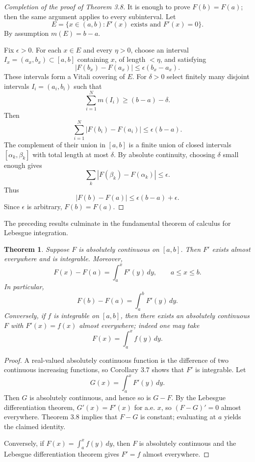 \documentclass[11pt,openany]{book}
\newtheorem{theorem}{Theorem}[section]
\begin{document}
\begin{proof}[Completion of the proof of Theorem 3.8]
It is enough to prove $F(b)=F(a)$; then the same argument applies to every subinterval. Let
\[
E=\{x\in(a,b):F'(x)\text{ exists and }F'(x)=0\}.
\]
By assumption $m(E)=b-a$.

Fix $\epsilon>0$. For each $x\in E$ and every $\eta>0$, choose an interval $I_x=(a_x,b_x)\subset[a,b]$ containing $x$, of length $<\eta$, and satisfying
\[
|F(b_x)-F(a_x)|\le\epsilon(b_x-a_x).
\]
These intervals form a Vitali covering of $E$. For $\delta>0$ select finitely many disjoint intervals $I_i=(a_i,b_i)$ such that
\begin{equation}
\sum_{i=1}^Nm(I_i)\ge(b-a)-\delta.
\tag{9}
\end{equation}
Then
\[
\sum_{i=1}^N|F(b_i)-F(a_i)|\le\epsilon(b-a).
\]
The complement of their union in $[a,b]$ is a finite union of closed intervals $[\alpha_k,\beta_k]$ with total length at most $\delta$. By absolute continuity, choosing $\delta$ small enough gives
\[
\sum_k|F(\beta_k)-F(\alpha_k)|\le\epsilon.
\]
Thus
\[
|F(b)-F(a)|
\le\epsilon(b-a)+\epsilon.
\]
Since $\epsilon$ is arbitrary, $F(b)=F(a)$.
\end{proof}

The preceding results culminate in the fundamental theorem of calculus for Lebesgue integration.

\begin{theorem}
Suppose $F$ is absolutely continuous on $[a,b]$. Then $F'$ exists almost everywhere and is integrable. Moreover,
\[
F(x)-F(a)=\int_a^xF'(y)\,dy,
\qquad a\le x\le b.
\]
In particular,
\[
F(b)-F(a)=\int_a^bF'(y)\,dy.
\]
Conversely, if $f$ is integrable on $[a,b]$, then there exists an absolutely continuous $F$ with $F'(x)=f(x)$ almost everywhere; indeed one may take
\[
F(x)=\int_a^x f(y)\,dy.
\]
\end{theorem}

\begin{proof}
A real-valued absolutely continuous function is the difference of two continuous increasing functions, so Corollary 3.7 shows that $F'$ is integrable. Let
\[
G(x)=\int_a^xF'(y)\,dy.
\]
Then $G$ is absolutely continuous, and hence so is $G-F$. By the Lebesgue differentiation theorem, $G'(x)=F'(x)$ for a.e. $x$, so $(F-G)'=0$ almost everywhere. Theorem 3.8 implies that $F-G$ is constant; evaluating at $a$ yields the claimed identity.

Conversely, if $F(x)=\int_a^x f(y)\,dy$, then $F$ is absolutely continuous and the Lebesgue differentiation theorem gives $F'=f$ almost everywhere.
\end{proof}
\end{document}
